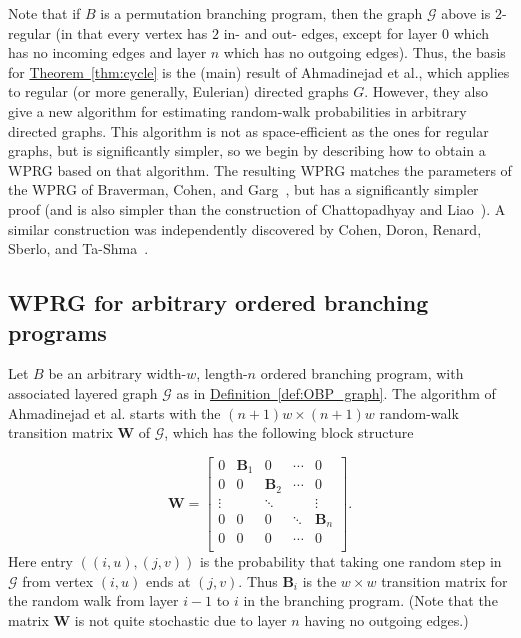 \documentclass[11pt]{article}
\numberwithin{equation}{section}
\theoremstyle{definition}
\theoremstyle{plain}
\newcommand{\expref}[2]{\hyperref[#2]{#1~\ref{#2}}}
\newcommand{\cG}{\mathcal{G}}
\newcommand{\mB}{\mathbf{B}}
\newcommand{\mW}{\mathbf{W}}
\newcommand{\bp}{{\mathbf{B}}}
\begin{document}
    Note that if $B$ is a permutation branching program, then the graph $\cG$ above is $2$-regular (in that every vertex has $2$ in- and out- edges, except for layer $0$ which has no incoming edges and layer $n$ which has no outgoing edges).  Thus, the basis for \expref{Theorem}{thm:cycle} is the (main) result 
    of %
Ahmadinejad  %
et al., which applies to regular (or more generally, Eulerian) directed graphs $G$.
    However, they also give a new algorithm for estimating random-walk probabilities in arbitrary directed graphs.  This
    algorithm is not as space-efficient as the ones for regular graphs, but is significantly simpler, so we begin by describing how to
    obtain a WPRG based on that algorithm.  The resulting WPRG matches the parameters of the WPRG of Braverman, Cohen, and Garg~\cite{BravermanCoGa18}, but has a significantly simpler proof (and is also simpler than the construction of %
     Chattopadhyay %
     and Liao~\cite{ChattopadhyayLi20}). A similar construction was independently discovered by Cohen, Doron, Renard, Sberlo, and Ta-Shma~\cite{CohenDoReSbTa21}.
    
    \subsection{WPRG for arbitrary ordered branching programs}\label{subsec:OBP_overview}
    Let $B$ be an arbitrary width-$w$, length-$n$ ordered branching program, with associated layered graph $\cG$ as in \expref{Definition}{def:OBP_graph}.  The algorithm of
%
Ahmadinejad  %
et al. starts with the $(n+1)w\times (n+1)w$
%
random-walk transition matrix $\mW$ of $\cG$, which has the following block structure %

    $$\mW=
    \begin{bmatrix}
    0 & \mB_1 & 0 & \cdots & 0 \\
    0 & 0 & \mB_2 & \cdots & 0 \\
    \vdots & & \ddots & & \vdots\\
    0 & 0 & 0 & \ddots & \mB_n\\
    0 & 0 & 0 & \cdots &  0 \\
    \end{bmatrix}.$$ %
    Here entry $((i,u),(j,v))$ is the probability that taking one random step in $\cG$ from vertex $(i,u)$ ends at $(j,v)$.  Thus $\bp_i$ is the $w\times w$ transition matrix for the random walk from layer $i-1$ to $i$ in the branching program.
   (Note that the matrix $\mW$ is not quite stochastic due to layer $n$ having no
   outgoing edges.)
   
\end{document}
